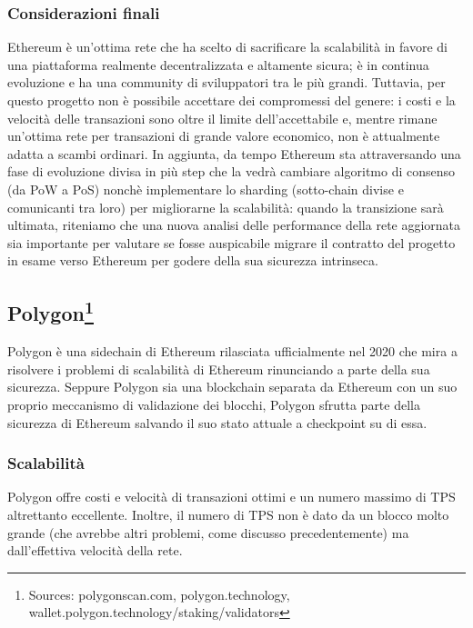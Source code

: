 \documentclass[a4paper, 12pt]{article}
\begin{document}
\newpage
\subsubsection*{Considerazioni finali}
Ethereum è un'ottima rete che ha scelto di sacrificare la scalabilità in favore di una piattaforma realmente decentralizzata e altamente sicura; è in continua evoluzione
e ha una community di sviluppatori tra le più grandi. Tuttavia, per questo progetto non è possibile accettare dei compromessi del genere: i costi e la velocità delle transazioni
sono oltre il limite dell'accettabile e, mentre rimane un'ottima rete per transazioni di grande valore economico, non è attualmente adatta a scambi ordinari.
In aggiunta, da tempo Ethereum sta attraversando una fase di evoluzione divisa in più step che la vedrà cambiare algoritmo di consenso (da PoW a PoS) nonchè implementare
lo sharding (sotto-chain divise e comunicanti tra loro) per migliorarne la scalabilità: quando la transizione sarà ultimata, riteniamo che una nuova analisi delle performance
della rete aggiornata sia importante per valutare se fosse auspicabile migrare il contratto del progetto in esame verso Ethereum per godere della sua sicurezza intrinseca.

\newpage
\subsection*{Polygon\footnote{Sources: polygonscan.com, polygon.technology, wallet.polygon.technology/staking/validators}}
Polygon è una sidechain di Ethereum rilasciata ufficialmente nel 2020 che mira a risolvere i problemi di scalabilità di Ethereum rinunciando a parte della sua sicurezza.
Seppure Polygon sia una blockchain separata da Ethereum con un suo proprio meccanismo di validazione dei blocchi, Polygon sfrutta parte della sicurezza di Ethereum salvando il suo stato attuale a checkpoint su di essa.

\subsubsection*{Scalabilità}
Polygon offre costi e velocità di transazioni ottimi e un numero massimo di TPS altrettanto eccellente.
Inoltre, il numero di TPS non è dato da un blocco molto grande (che avrebbe altri problemi, come discusso precedentemente) ma dall'effettiva velocità della rete.
\end{document}
